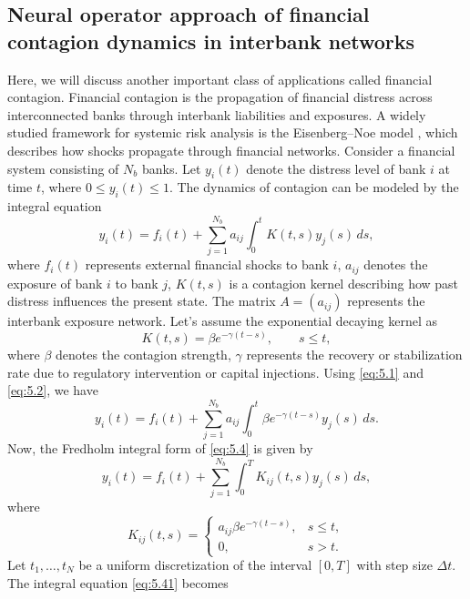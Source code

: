 \documentclass[preprint,12pt,authoryear]{elsarticle}
\begin{document}
\subsection{Neural operator approach of financial contagion dynamics in interbank networks}
Here, we will discuss another important class of applications called financial contagion. Financial contagion is the propagation of financial distress
across interconnected banks through interbank liabilities and
exposures. A widely studied framework for systemic risk analysis is
the Eisenberg--Noe model \cite{eisenberg2001systemic}, which describes how shocks propagate
through financial networks. Consider a financial system consisting of $N_b$ banks. Let $y_i(t)$
denote the distress level of bank $i$ at time $t$, where $0 \le y_i(t) \le 1.$ The dynamics of contagion can be modeled by the integral equation
\begin{equation}
y_i(t)
=
f_i(t)
+
\sum_{j=1}^{N_b}
a_{ij}
\int_0^t
K(t,s)y_j(s)\,ds ,
\label{eq:5.1}
\end{equation}
where $f_i(t)$ represents external financial shocks to bank $i$, $a_{ij}$ denotes the exposure of bank $i$ to bank $j$, $K(t,s)$ is a contagion kernel describing how past distress influences the present state. The matrix $A=(a_{ij})$ represents the interbank exposure network. Let's assume the exponential decaying kernel as
\begin{equation}
K(t,s)
=
\beta e^{-\gamma (t-s)}, \qquad s\le t,
\label{eq:5.2}
\end{equation}
where $\beta$ denotes the contagion strength, $\gamma$ represents the recovery or stabilization rate due to regulatory intervention or capital injections. Using \eqref{eq:5.1} and \eqref{eq:5.2}, we have
\begin{equation}
y_i(t)
=
f_i(t)
+
\sum_{j=1}^{N_b}
a_{ij}
\int_0^t
\beta e^{-\gamma (t-s)}y_j(s)\,ds .
\label{eq:5.4}
\end{equation}
Now, the Fredholm integral form of \eqref{eq:5.4} is given by 
\begin{equation}
y_i(t)
=
f_i(t)
+
\sum_{j=1}^{N_b}
\int_0^T
K_{ij}(t,s)y_j(s)\,ds ,
\label{eq:5.41}
\end{equation}
where
\[
K_{ij}(t,s)
=
\begin{cases}
a_{ij}\beta e^{-\gamma (t-s)}, & s \le t, \\
0, & s>t.
\end{cases}
\]
Let $t_1,\dots,t_N$ be a uniform discretization of the interval $[0,T]$ with step size $\Delta t$.
The integral equation \eqref{eq:5.41} becomes
\end{document}
